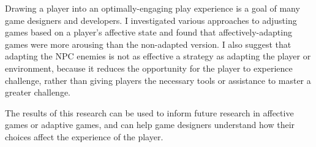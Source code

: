 
Drawing a player into an optimally-engaging play experience is a goal of many game designers and developers. I investigated various approaches to adjusting games based on a player's affective state and found that affectively-adapting games were more arousing than the non-adapted version. I also suggest that adapting the NPC enemies is not as effective a strategy as adapting the player or environment, because it reduces the opportunity for the player to experience challenge, rather than giving players the necessary tools or assistance to master a greater challenge.

The results of this research can be used to inform future research in affective games or adaptive games, and can help game designers understand how their choices affect the experience of the player.
